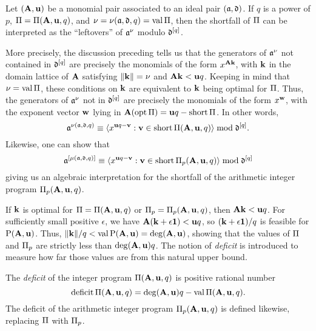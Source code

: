 \documentclass{amsart}
\begin{document}
\begin{remark}
\label{shortfall motivation: R}
Let $(\mathbf{A},\mathbf{u})$ be a monomial pair associated to an ideal pair $(\mathfrak{a},\mathfrak{d})$.
If $q$ is a power of $p$, $\Pi = \Pi(\mathbf{A},\mathbf{u},q)$, and $\nu = \nu(\mathfrak{a},\mathfrak{d},q) = \operatorname{val} \Pi$, then the shortfall of $\Pi$ can be interpreted as the ``leftovers'' of $\mathfrak{a}^\nu$ modulo $\mathfrak{d}^{[q]}$.

More precisely, the discussion preceding  tells us that the generators of $\mathfrak{a}^{\nu}$ not contained in $\mathfrak{d}^{[q]}$ are precisely the monomials of the form $x^{\mathbf{A} \mathbf{k}}$, with $\mathbf{k}$ in the domain lattice of $\mathbf{A}$ satisfying $\| \mathbf{k} \| = \nu$ and $\mathbf{A}\mathbf{k}<\mathbf{u}q$.
Keeping in mind that $\nu= \operatorname{val} \Pi$, these conditions on $\mathbf{k}$ are equivalent to $\mathbf{k}$ being optimal for $\Pi$.
Thus, the generators of $\mathfrak{a}^{\nu}$ not in $\mathfrak{d}^{[q]}$ are precisely the monomials of the form $x^{\mathbf{w}}$, with the exponent vector $\mathbf{w}$ lying in $\mathbf{A}(\operatorname{opt} \Pi) = \mathbf{u}q - \operatorname{short} \Pi$.
In other words,
\begin{equation}
\label{algebraic shortfall PI general: e}
 \mathfrak{a}^{\nu(\mathfrak{a}, \mathfrak{d}, q)} \equiv \langle x^{\mathbf{u}q-\mathbf{v}}: \mathbf{v} \in \operatorname{short} \Pi(\mathbf{A},\mathbf{u},q) \rangle \bmod \mathfrak{d}^{[q]}.
 \end{equation}
Likewise, one can show that
\begin{equation}
\label{algebraic shortfall PI_p general: e}
\mathfrak{a}^{[\mu(\mathfrak{a}, \mathfrak{d}, q)]} \equiv \langle x^{\mathbf{u}q-\mathbf{v}}: \mathbf{v} \in \operatorname{short} \Pi_p(\mathbf{A},\mathbf{u},q) \rangle \bmod \mathfrak{d}^{[q]}
\end{equation}
giving us an algebraic interpretation for the shortfall of the arithmetic integer program $\Pi_p(\mathbf{A},\mathbf{u},q)$.
\end{remark}

If $\mathbf{k}$ is optimal for $\Pi = \Pi(\mathbf{A},\mathbf{u},q)$ or $\Pi_p = \Pi_p(\mathbf{A},\mathbf{u},q)$, then $\mathbf{A}\mathbf{k} < \mathbf{u}q$.
For sufficiently small positive $\epsilon$, we have $\mathbf{A}(\mathbf{k}+\epsilon\mathbf{1}) < \mathbf{u}q$, so $(\mathbf{k}+\epsilon \mathbf{1})/q$ is feasible for $\mathrm{P}(\mathbf{A},\mathbf{u})$.
Thus, $\| \mathbf{k} \|/q < \operatorname{val} \mathrm{P}(\mathbf{A},\mathbf{u}) = \operatorname{deg}(\mathbf{A},\mathbf{u})$, showing that the values of $\Pi$ and $\Pi_p$ are strictly less than $\operatorname{deg}(\mathbf{A},\mathbf{u})q$.
The notion of \emph{deficit} is introduced to measure how far those values are from this natural upper bound.

\begin{definition}
   The \emph{deficit} of the integer program $\Pi(\mathbf{A}, \mathbf{u}, q)$ is positive rational number
   \[ \operatorname{deficit} \Pi(\mathbf{A}, \mathbf{u}, q) = \operatorname{deg}(\mathbf{A},\mathbf{u})q - \operatorname{val} \Pi(\mathbf{A}, \mathbf{u}, q).\]
   The deficit of the arithmetic integer program $\Pi_p(\mathbf{A}, \mathbf{u}, q)$ is defined likewise, replacing $\Pi$ with $\Pi_p$.
\end{definition}
\end{document}
